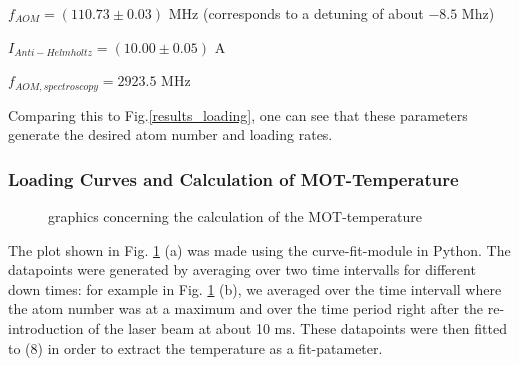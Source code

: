 \documentclass[12pt, a4paper]{article}
\begin{document}
\bigskip
$f_{AOM}=(110.73 \pm 0.03)$ MHz (corresponds to a detuning of about $-8.5$ Mhz)

$I_{Anti-Helmholtz}=(10.00 \pm 0.05)$ A

$f_{AOM, spectroscopy}=2923.5$ MHz 

\bigskip
Comparing this to Fig.\ref{results_loading}, one can see that these parameters generate the desired atom number and loading rates.

\subsubsection{Loading Curves and Calculation of MOT-Temperature}

\begin{figure}[h]
\centering
\caption{graphics concerning the calculation of the MOT-temperature}
	\label{erf_fit}
\end{figure}

The plot shown in Fig. \ref{erf_fit} (a) was made using the curve-fit-module in 
Python. The datapoints were generated by averaging over two time intervalls for 
different down times: for example in Fig. \ref{erf_fit} (b), we averaged over the 
time intervall where the atom number was at a maximum and over the time period 
right after the re-introduction of the laser beam at about 10 ms. These datapoints were then fitted to (8) in order to extract the temperature as a fit-patameter. 
\end{document}
